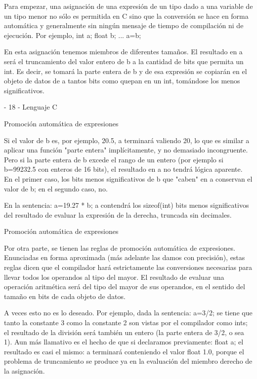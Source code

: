 Para empezar, una asignación de una expresión de un tipo dado a una variable de un tipo menor no
sólo es permitida en C sino que la conversión se hace en forma automática y generalmente sin ningún
mensaje de tiempo de compilación ni de ejecución. Por ejemplo,
int a;
float b;
...
a=b;

En esta asignación tenemos miembros de diferentes tamaños. El resultado en a será el truncamiento
del valor entero de b a la cantidad de bits que permita un int. Es decir, se tomará la parte entera de b y
de esa expresión se copiarán en el objeto de datos de a tantos bits como quepan en un int, tomándose
los menos significativos.

- 18 -
Lenguaje C

Promoción automática de expresiones

Si el valor de b es, por ejemplo, 20.5, a terminará valiendo 20, lo que es similar a aplicar una función
"parte entera" implícitamente, y no demasiado incongruente. Pero si la parte entera de b excede el
rango de un entero (por ejemplo si b=99232.5 con enteros de 16 bits), el resultado en a no tendrá
lógica aparente. En el primer caso, los bits menos significativos de b que "caben" en a conservan el
valor de b; en el segundo caso, no.

En la sentencia:
a=19.27 * b;
a contendrá los sizeof(int) bits menos significativos del resultado de evaluar la expresión de la
derecha, truncada sin decimales.

Promoción automática de expresiones

Por otra parte, se tienen las reglas de promoción automática de expresiones. Enunciadas en forma
aproximada (más adelante las damos con precisión), estas reglas dicen que el compilador hará
estrictamente las conversiones necesarias para llevar todos los operandos al tipo del mayor. El
resultado de evaluar una operación aritmética será del tipo del mayor de sus operandos, en el sentido
del tamaño en bits de cada objeto de datos.

A veces esto no es lo deseado. Por ejemplo, dada la sentencia:
a=3/2;
se tiene que tanto la constante 3 como la constante 2 son vistas por el compilador como ints; el
resultado de la división será también un entero (la parte entera de 3/2, o sea 1). Aun más llamativo es
el hecho de que si declaramos previamente:
float a;
el resultado es casi el mismo: a terminará conteniendo el valor float 1.0, porque el problema de
truncamiento se produce ya en la evaluación del miembro derecho de la asignación.


